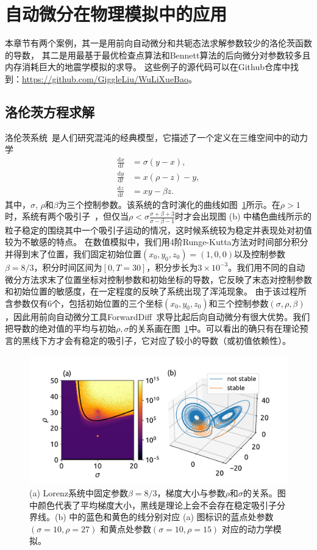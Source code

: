 \documentclass[A4,twoside,UTF8]{ctexart}
\def\D{\mathrm{d}}
\begin{document}
\section{自动微分在物理模拟中的应用}\label{sec:applications}
本章节有两个案例，其一是用前向自动微分和共轭态法求解参数较少的洛伦茨函数的导数，
其二是用最基于最优检查点算法和Bennett算法的后向微分对参数较多且内存消耗巨大的地震学模拟的求导。
这些例子的源代码可以在Github仓库中找到：\href{https://github.com/GiggleLiu/WuLiXueBao}{https://github.com/GiggleLiu/WuLiXueBao}。

\subsection{洛伦茨方程求解}
洛伦茨系统~\cite{Lorenz1963}是人们研究混沌的经典模型，它描述了一个定义在三维空间中的动力学
\begin{align*}
    \frac{\D x}{\D t} &= \sigma(y - x),\\
    \frac{\D y}{\D t} &= x(\rho -z) - y,\\
    \frac{\D z}{\D t} &= xy-\beta z.
\end{align*}
其中，$\sigma$, $\rho$和$\beta$为三个控制参数。该系统的含时演化的曲线如图~\ref{fig:chaos}所示。在$\rho>1$时，系统有两个吸引子~\cite{Hirsch2012}，但仅当$\rho < \sigma \frac{\sigma + \beta + 3}{\sigma - \beta - 1}$时才会出现图 (b) 中橘色曲线所示的粒子稳定的围绕其中一个吸引子运动的情况，这时候系统较为稳定并表现处对初值较为不敏感的特点。
在数值模拟中，我们用4阶Runge-Kutta方法对时间部分积分并得到末了位置，我们固定初始位置$(x_0,y_0,z_0) = (1, 0, 0)$以及控制参数$\beta=8/3$，积分时间区间为$[0,T=30]$，积分步长为$3\times 10^{-3}$。我们用不同的自动微分方法求末了位置坐标对控制参数和初始坐标的导数，它反映了末态对控制参数和初始位置的敏感度，在一定程度的反映了系统出现了浑沌现象。
由于该过程所含参数仅有6个，包括初始位置的三个坐标$(x_0, y_0, z_0)$和三个控制参数$(\sigma, \rho,\beta)$，因此用前向自动微分工具ForwardDiff~\cite{Revels2016}求导比起后向自动微分有很大优势。我们把导数的绝对值的平均与初始$\rho,\sigma$的关系画在图~\ref{fig:chaos}中。可以看出的确只有在理论预言的黑线下方才会有稳定的吸引子，它对应了较小的导数（或初值依赖性）。
\begin{figure}[t]
\centering
\includegraphics[width=0.8\columnwidth]{./fig4.pdf}
    \caption{(a) Lorenz系统中固定参数$\beta=8/3$，梯度大小与参数$\rho$和$\sigma$的关系。图中颜色代表了平均梯度大小，黑线是理论上会不会存在稳定吸引子分界线。(b) 中的蓝色和黄色的线分别对应 (a) 图标识的蓝点处参数 $(\sigma=10, \rho=27)$ 和黄点处参数$(\sigma=10, \rho=15)$ 对应的动力学模拟。\label{fig:chaos}}
\end{figure}
\end{document}
